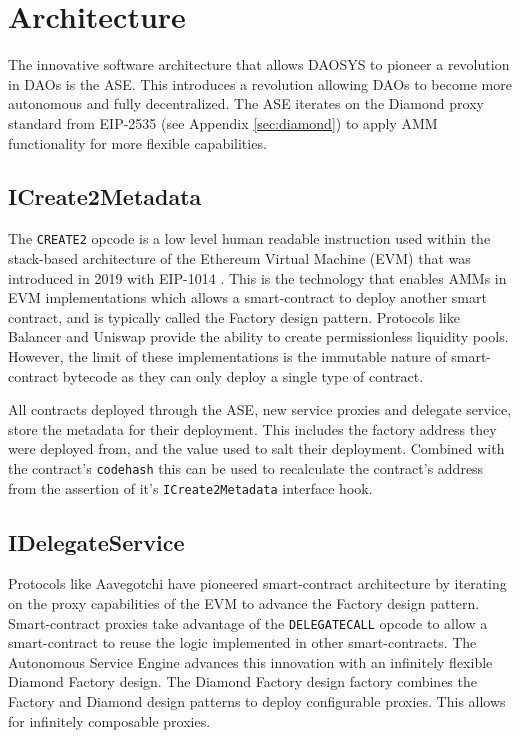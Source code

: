\documentclass[journal,twocolumn,12pt]{ieeesyscoin}
\begin{document}
\section{Architecture}
\label{sec:architecture}

The innovative software architecture that allows DAOSYS to pioneer a revolution in DAOs is the ASE. This introduces a revolution allowing DAOs to become more autonomous and fully decentralized. The ASE iterates on the Diamond proxy standard from EIP-2535 (see Appendix \ref{sec:diamond}) to apply AMM functionality for more flexible capabilities.

\subsection{ICreate2Metadata}

The \texttt{CREATE2} opcode is a low level human readable instruction used within the stack-based architecture of the Ethereum Virtual Machine (EVM) that was introduced in 2019 with EIP-1014 \cite{But18}. This is the technology that enables AMMs in EVM implementations which allows a smart-contract to deploy another smart contract, and is typically called the Factory design pattern. Protocols like Balancer and Uniswap provide the ability to create permissionless liquidity pools. However, the limit of these implementations is the immutable nature of smart-contract bytecode as they can only deploy a single type of contract. 

All contracts deployed through the ASE, new service proxies and delegate service, store the metadata for their deployment. This includes the factory address they were deployed from, and the value used to salt their deployment. Combined with the contract’s \texttt{codehash} this can be used to recalculate the contract’s address from the assertion of it’s \texttt{ICreate2Metadata} interface hook.

\subsection{IDelegateService}

Protocols like Aavegotchi have pioneered smart-contract architecture by iterating on the proxy capabilities of the EVM to advance the Factory design pattern. Smart-contract proxies take advantage of the \texttt{DELEGATECALL} opcode to allow a smart-contract to reuse the logic implemented in other smart-contracts. The Autonomous Service Engine advances this innovation with an infinitely flexible Diamond Factory design. The Diamond Factory design factory combines the Factory and Diamond design patterns to deploy configurable proxies. This allows for infinitely composable proxies.
\end{document}
